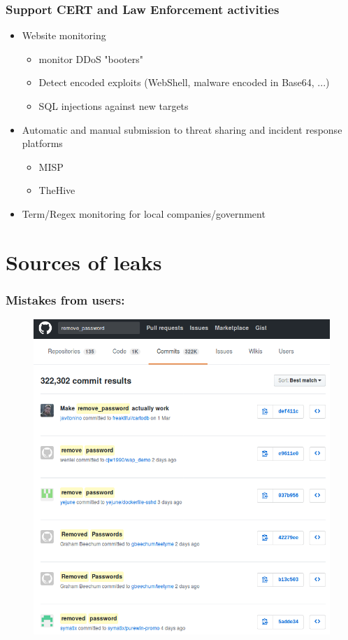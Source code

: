 \documentclass{beamer}
\begin{document}
\begin{frame}
    \frametitle{Support CERT and Law Enforcement activities}
    	\begin{itemize}
		    \item Website monitoring
		    	\begin{itemize}
				    \item monitor DDoS "booters"
				    \item Detect encoded exploits (WebShell, malware encoded in Base64, ...)
				    \item SQL injections against new targets
		    	\end{itemize}
		    \item Automatic and manual submission to threat sharing and incident
response platforms
			\begin{itemize}
				\item MISP
				\item TheHive
			\end{itemize}
		    \item Term/Regex monitoring for local companies/government
        \end{itemize}
\end{frame}

\section{Sources of leaks}

\begin{frame}
    \frametitle{Mistakes from users:}
        \begin{figure}
            \includegraphics[scale=0.4]{images/git-pass.png}
        \end{figure}
\end{frame}
\end{document}
